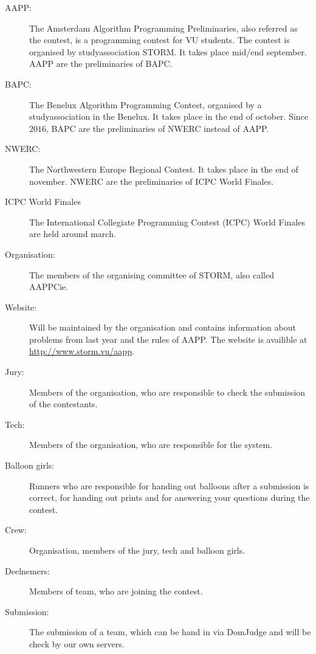 \begin{description}
\item[AAPP:]
The Amsterdam Algorithm Programming Preliminaries, also referred as the contest, is a programming contest for VU students. The contest is organised by studyassociation STORM. It takes place mid/end september. AAPP are the preliminaries of BAPC.

\item[BAPC:]
The Benelux Algorithm Programming Contest, organised by a studyassociation in the Benelux. It takes place in the end of october. Since $2016$, BAPC are the preliminaries of NWERC instead of AAPP.

\item[NWERC:]
The Northwestern Europe Regional Contest. It takes place in the end of november. NWERC are the preliminaries of ICPC World Finales.

\item[ICPC World Finales]
The International Collegiate Programming Contest (ICPC) World Finales are held around march.

\item[Organisation:]
The members of the organising committee of STORM, also called AAPPCie.

\item[Website:]
Will be maintained by the organisation and contains information about problems from last year and the rules of AAPP. The website is availible at \url{http://www.storm.vu/aapp}.

\item[Jury:]
Members of the organisation, who are responsible to check the submission of the contestants.

\item[Tech:]
Members of the organisation, who are responsible for the system.

\item[Balloon girls:]
Runners who are responsible for handing out balloons after a submission is correct, for handing out prints and for answering your questions during the contest.

\item[Crew:]
Organisation, members of the jury, tech and balloon girls.

\item[Deelnemers:]
Members of team, who are joining the contest.

\item[Submission:]
The submission of a team, which can be hand in via DomJudge and will be check by our own servers.
\end{description}